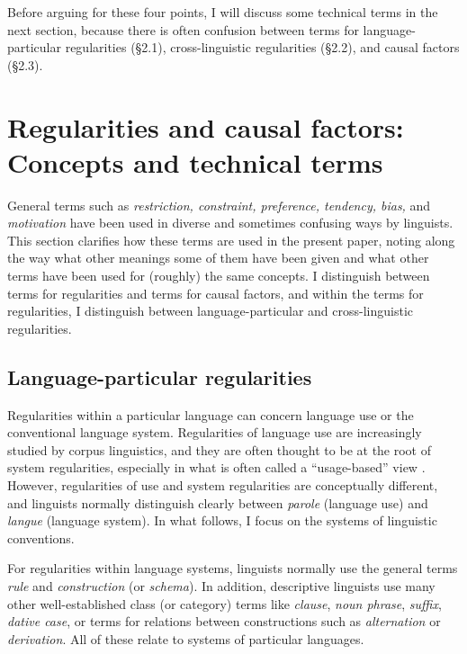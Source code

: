 \documentclass[output=paper]{langsci/langscibook}
\begin{document}
Before arguing for these four points, I will discuss some technical terms in the next section, because there is often confusion between terms for language-particular regularities (§2.1), cross-linguistic regularities (§2.2), and causal factors (§2.3).

\section{Regularities and causal factors: Concepts and technical terms}\label{sec:haspelmath:2}

General terms such as \textit{restriction, constraint, preference, tendency, bias,} and \textit{motivation} have been used in diverse and sometimes confusing ways by linguists. This section clarifies how these terms are used in the present paper, noting along the way what other meanings some of them have been given and what other terms have been used for (roughly) the same concepts. I distinguish between terms for regularities and terms for causal factors, and within the terms for regularities, I distinguish between language-particular and cross-linguistic regularities.

\subsection{Language-particular regularities}\label{sec:haspelmath:2.1}

Regularities within a particular language can concern language use or the conventional language system. Regularities of language use are increasingly studied by corpus linguistics, and they are often thought to be at the root of system regularities, especially in what is often called a “usage-based” view \citep{Bybee2010}. However, regularities of use and system regularities are conceptually different, and linguists normally distinguish clearly between \textit{parole} (language use) and \textit{langue} (language system). In what follows, I focus on the systems of linguistic conventions.

For regularities within language systems, linguists normally use the general terms \textit{rule} and \textit{construction} (or \textit{schema}). In addition, descriptive linguists use many other well-established class (or category) terms like \textit{clause}, \textit{noun phrase}, \textit{suffix}, \textit{dative case}, or terms for relations between constructions such as \textit{alternation} or \textit{derivation}. All of these relate to systems of particular languages.
\end{document}
